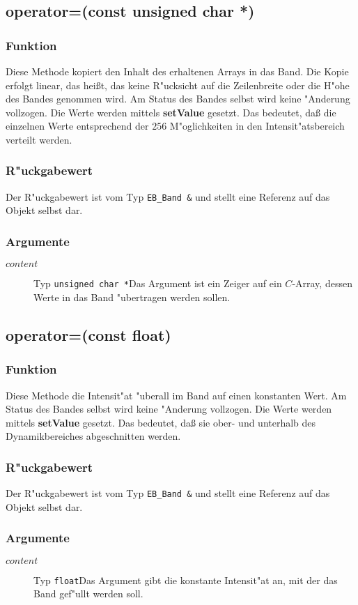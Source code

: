 \documentclass[12pt,a4paper,draft,twoside,onecolumn,titlepage]{book}
\newcommand{\method}[1]{{\bf #1}}
\newcommand{\carg}[1]{$ #1 $}
\newcommand{\ctyp}[1]{{\tt #1}}
\newcommand{\arglist}[1]{\footnotesize{#1}}
\begin{document}
\subsection{operator=\arglist{(const unsigned char *)}}
\subsubsection{Funktion}
Diese Methode kopiert den Inhalt des erhaltenen Arrays in das Band. Die Kopie erfolgt linear, das hei{\ss}t, das keine R"ucksicht auf die Zeilenbreite oder die H"ohe des Bandes genommen wird. Am Status des Bandes selbst wird keine "Anderung vollzogen. Die Werte werden mittels \method{setValue} gesetzt. Das bedeutet, da{\ss} die einzelnen Werte entsprechend der $256$ M"oglichkeiten in den Intensit"atsbereich verteilt werden.
\subsubsection{R"uckgabewert}
Der R"uckgabewert ist vom Typ \ctyp{EB\_Band \&} und stellt eine Referenz auf das Objekt selbst dar. 
\subsubsection{Argumente}
\begin{description}
\item[\carg{content}]{Typ \ctyp{unsigned char *}Das Argument ist ein Zeiger auf ein $C$-Array, dessen Werte in das Band "ubertragen werden sollen.}
\end{description}
\subsection{operator=\arglist{(const float)}}
\subsubsection{Funktion}
Diese Methode die Intensit"at "uberall im Band auf einen konstanten Wert. Am Status des Bandes selbst wird keine "Anderung vollzogen. Die Werte werden mittels \method{setValue} gesetzt. Das bedeutet, da{\ss} sie ober- und unterhalb des Dynamikbereiches abgeschnitten werden.
\subsubsection{R"uckgabewert}
Der R"uckgabewert ist vom Typ \ctyp{EB\_Band \&} und stellt eine Referenz auf das Objekt selbst dar. 
\subsubsection{Argumente}
\begin{description}
\item[\carg{content}]{Typ \ctyp{float}Das Argument gibt die konstante Intensit"at an, mit der das Band gef"ullt werden soll.}
\end{description}
\end{document}
